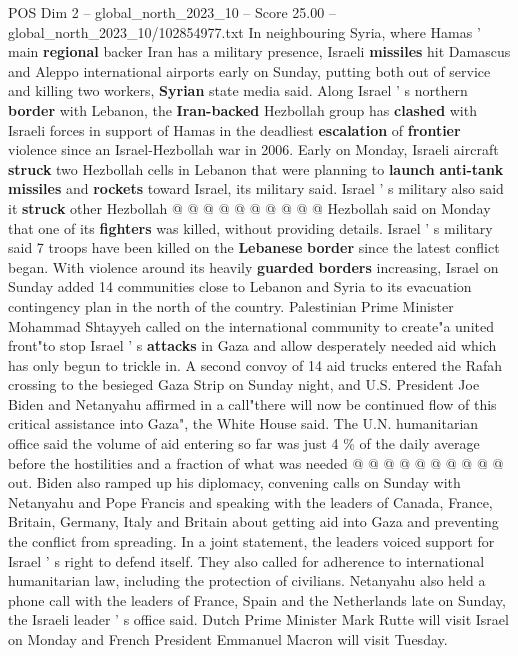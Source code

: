 \begin{textsample}{POS Dim 2 – global\_north\_2023\_10 – Score 25.00 – global\_north\_2023\_10/102854977.txt}
In neighbouring Syria, where Hamas ' main \textbf{regional} backer Iran has a military presence, Israeli \textbf{missiles} hit Damascus and Aleppo international airports early on Sunday, putting both out of service and killing two workers, \textbf{Syrian} state media said.
Along Israel ' s northern \textbf{border} with Lebanon, the \textbf{Iran-backed} Hezbollah group has \textbf{clashed} with Israeli forces in support of Hamas in the deadliest \textbf{escalation} of \textbf{frontier} violence since an Israel-Hezbollah war in 2006.
Early on Monday, Israeli aircraft \textbf{struck} two Hezbollah cells in Lebanon that were planning to \textbf{launch} \textbf{anti-tank} \textbf{missiles} and \textbf{rockets} toward Israel, its military said.
Israel ' s military also said it \textbf{struck} other Hezbollah @ @ @ @ @ @ @ @ @ @ Hezbollah said on Monday that one of its \textbf{fighters} was killed, without providing details.
Israel ' s military said 7 troops have been killed on the \textbf{Lebanese} \textbf{border} since the latest conflict began.
With violence around its heavily \textbf{guarded} \textbf{borders} increasing, Israel on Sunday added 14 communities close to Lebanon and Syria to its evacuation contingency plan in the north of the country.
Palestinian Prime Minister Mohammad Shtayyeh called on the international community to create"a united front"to stop Israel ' s \textbf{attacks} in Gaza and allow desperately needed aid which has only begun to trickle in.
A second convoy of 14 aid trucks entered the Rafah crossing to the besieged Gaza Strip on Sunday night, and U.S.
President Joe Biden and Netanyahu affirmed in a call"there will now be continued flow of this critical assistance into Gaza", the White House said.
The U.N. humanitarian office said the volume of aid entering so far was just 4 \% of the daily average before the hostilities and a fraction of what was needed @ @ @ @ @ @ @ @ @ @ out.
Biden also ramped up his diplomacy, convening calls on Sunday with Netanyahu and Pope Francis and speaking with the leaders of Canada, France, Britain, Germany, Italy and Britain about getting aid into Gaza and preventing the conflict from spreading.
In a joint statement, the leaders voiced support for Israel ' s right to defend itself.
They also called for adherence to international humanitarian law, including the protection of civilians.
Netanyahu also held a phone call with the leaders of France, Spain and the Netherlands late on Sunday, the Israeli leader ' s office said.
Dutch Prime Minister Mark Rutte will visit Israel on Monday and French President Emmanuel Macron will visit Tuesday.

\end{textsample}
